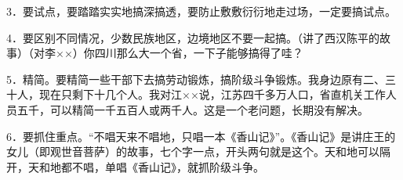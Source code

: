 3．要试点，要踏踏实实地搞深搞透，要防止敷敷衍衍地走过场，一定要搞试点。

4．要区别不同情况，少数民族地区，边境地区不要一起搞。（讲了西汉陈平的故事）（对李××）你四川那么大一个省，一下子能够搞得了哇？

5．精简。要精简一些干部下去搞劳动锻炼，搞阶级斗争锻炼。我身边原有二、三十人，现在只剩下十几个人。我对江××说，江苏四千多万人口，省直机关工作人员五千，可以精简一千五百人或两千人。这是一个老问题，长期没有解决。

6．要抓住重点。“不唱天来不唱地，只唱一本《香山记》”。《香山记》是讲庄王的女儿（即观世音菩萨）的故事，七个字一点，开头两句就是这个。天和地可以隔开，天和地都不唱，单唱《香山记》，就抓阶级斗争。


